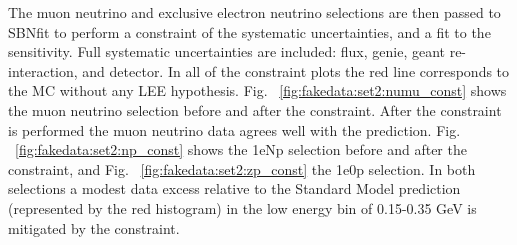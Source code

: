 The muon neutrino and exclusive electron neutrino selections are then passed to SBNfit to perform a constraint of the systematic uncertainties, and a fit to the sensitivity.  Full systematic uncertainties are included: flux, genie, geant re-interaction, and detector.  In all of the constraint plots the red line corresponds to the MC without any LEE hypothesis. Fig. ~\ref{fig:fakedata:set2:numu_const} shows the muon neutrino selection before and after the constraint. After the constraint is performed the muon neutrino data agrees well with the prediction.   
Fig. ~\ref{fig:fakedata:set2:np_const} shows the 1eNp selection before and after the constraint, and Fig. ~\ref{fig:fakedata:set2:zp_const} the 1e0p selection.  In both selections a modest data excess relative to the Standard Model prediction (represented by the red histogram) in the low energy bin of 0.15-0.35 GeV is  mitigated by the constraint.

